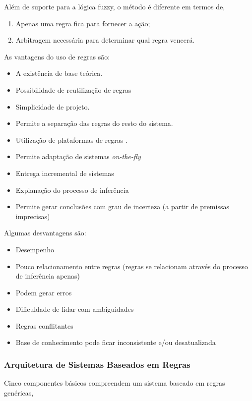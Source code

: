 \documentclass[12pt,a4paper,compsoc]{IEEEtran}
\begin{document}
  Além de suporte para a lógica fuzzy, o método é diferente em termos de,
  
  \begin{enumerate}
    \item Apenas uma regra fica para fornecer a ação;
    \item Arbitragem necessária para determinar qual regra vencerá.
  \end{enumerate}
  
  As vantagens do uso de regras são:

  \begin{itemize}
    \item A existência de base teórica.
    \item Possibilidade de reutilização de regras
    \item Simplicidade de projeto. 
    \item Permite a separação das regras do resto do sistema.
    \item Utilização de plataformas de regras .
    \item Permite adaptação de sistemas \textit{on-the-fly}
    \item Entrega incremental de sistemas
    \item Explanação do processo de inferência
    \item Permite gerar conclusões com grau de incerteza (a partir de premissas imprecisas)
  \end{itemize}
  
  Algumas desvantagens são:

  \begin{itemize}
    \item Desempenho
    \item Pouco relacionamento entre regras (regras se relacionam através do processo de inferência
    apenas)
    \item Podem gerar erros
    \item Dificuldade de lidar com ambiguidades
    \item Regras conflitantes
    \item Base de conhecimento  pode ficar inconsistente e/ou desatualizada  
  \end{itemize}


\subsubsection{Arquitetura de Sistemas Baseados em Regras}

  Cinco componentes básicos compreendem um sistema baseado em regras genéricas,
\end{document}
